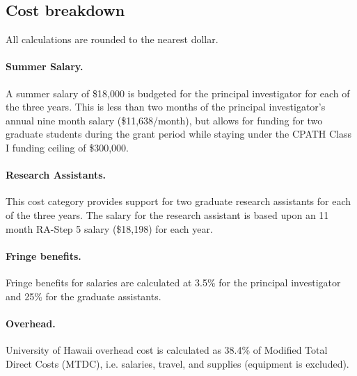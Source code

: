 \subsection*{Cost breakdown}
\label{cost-breakdown}

All calculations are rounded to the nearest dollar.

\paragraph{Summer Salary.}  
A summer salary of \$18,000 is budgeted for the principal investigator for
each of the three years.  This is less than two months of the principal
investigator's annual nine month salary (\$11,638/month), but allows for funding
for two graduate students during the grant period while staying under the 
CPATH Class I funding ceiling of \$300,000.

\paragraph*{Research Assistants.}  
This cost category provides support for two graduate research assistants
for each of the three years.  The salary for the research assistant is
based upon an 11 month RA-Step 5 salary (\$18,198) for each year.

\paragraph*{Fringe benefits.} 
Fringe benefits for salaries are calculated at 3.5\% for the principal
investigator and 25\% for the graduate assistants.

\paragraph*{Overhead.}  
University of Hawaii overhead cost is calculated as 38.4\% of Modified Total
Direct Costs (MTDC), i.e. salaries, travel, and supplies (equipment is
excluded).





